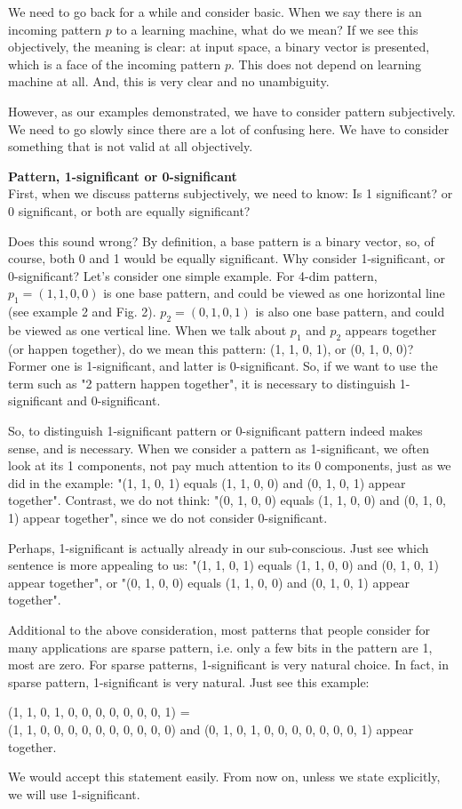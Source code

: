 We need to go back for a while and consider basic. When we say there is an incoming pattern $p$ to a learning machine, what do we mean? If we see this objectively, the meaning is clear: at input space, a binary vector is presented, which is a face of the incoming pattern $p$. This does not depend on learning machine at all. And, this is very clear and no unambiguity.  

However, as our examples demonstrated, we have to consider pattern subjectively. We need to go slowly since there are a lot of confusing here. We have to consider something that is not valid at all objectively. 

{\bf Pattern, 1-significant or 0-significant }\\
First, when we discuss patterns subjectively, we need to know: Is 1 significant? or 0 significant, or both are equally significant?

Does this sound wrong? By definition, a base pattern is a binary vector, so, of course, both 0 and 1 would be equally significant. Why consider 1-significant, or 0-significant? Let's consider one simple example. For 4-dim pattern, $p_1 = (1, 1, 0, 0)$ is one base pattern, and could be viewed as one horizontal line (see example 2 and Fig. 2). $p_2 = (0, 1, 0, 1)$ is also one base pattern, and could be viewed as one vertical line. When we talk about $p_1$ and $p_2$ appears together (or happen together), do we mean this pattern: (1, 1, 0, 1), or (0, 1, 0, 0)? Former one is 1-significant, and latter is 0-significant. So, if we want to use the term such as "2 pattern happen together", it is necessary to distinguish 1-significant and 0-significant. 

So, to distinguish 1-significant pattern or 0-significant pattern indeed makes sense, and is necessary. When we consider a pattern as 1-significant, we often look at its 1 components, not pay much attention to its 0 components, just as we did in the example: "(1, 1, 0, 1) equals (1, 1, 0, 0) and (0, 1, 0, 1) appear together". Contrast, we do not think:  "(0, 1, 0, 0) equals (1, 1, 0, 0) and (0, 1, 0, 1) appear together", since we do not consider 0-significant. 

Perhaps, 1-significant is actually already in our sub-conscious. Just see which sentence is more appealing to us: "(1, 1, 0, 1) equals (1, 1, 0, 0) and (0, 1, 0, 1) appear together", or "(0, 1, 0, 0) equals (1, 1, 0, 0) and (0, 1, 0, 1) appear together". 

Additional to the above consideration, most patterns that people consider for many applications are sparse pattern, i.e. only a few bits in the pattern are 1, most are zero. For sparse patterns, 1-significant is very natural choice. In fact, in sparse pattern, 1-significant is very natural. Just see this example:
\begin{center}
(1, 1, 0, 1, 0, 0, 0, 0, 0, 0, 0, 1) =  \\ (1, 1, 0, 0, 0, 0, 0, 0, 0, 0, 0, 0)  and (0, 1, 0, 1, 0, 0, 0, 0, 0, 0, 0, 1) appear together.
\end{center}
We would accept this statement easily. 
From now on, unless we state explicitly, we will use 1-significant. \\


